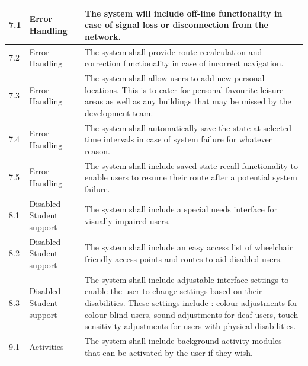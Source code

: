 \documentclass[12pt]{article}
\begin{document}
\begin{longtable}{|p{}| p{} | p{} |}
\hline

7.1& Error Handling & The system will include off-line functionality in case of signal loss or disconnection from the network.\\

\hline

7.2& Error Handling & The system shall provide route recalculation and correction functionality in case of incorrect navigation.\\

\hline

7.3& Error Handling & The system shall allow users to add new personal locations. This is to cater for personal favourite leisure areas as well as any buildings that may be missed by the development team. \\

\hline

7.4& Error Handling & The system shall automatically save the state at selected time intervals in case of system failure for whatever reason.\\

\hline

7.5& Error Handling & The system shall include saved state recall functionality to enable users to resume their route after a potential system failure.\\

\hline

8.1& Disabled Student support & The system shall include a special needs interface for visually impaired users.\\

\hline

8.2& Disabled Student support & The system shall include an easy access list of wheelchair friendly access points and routes to aid disabled users.\\

\hline

8.3& Disabled Student support & The system shall include adjustable interface settings to enable  the user to change settings based on their disabilities. These settings include : colour adjustments for colour blind users, sound adjustments for deaf users, touch sensitivity adjustments for users with physical disabilities.\\

\hline

9.1& Activities & The system shall include background activity modules that can be activated by the user if they wish.\\


\end{longtable}
\end{document}
